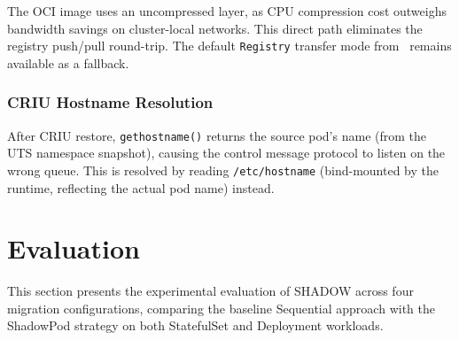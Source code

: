 \documentclass[conference]{IEEEtran}
\begin{document}
The OCI image uses an uncompressed layer, as CPU compression cost outweighs
bandwidth savings on cluster-local networks. This direct path eliminates the
registry push/pull round-trip. The default \texttt{Registry} transfer mode
from~\cite{dinhtuan2025k8s} remains available as a fallback.

\subsubsection{CRIU Hostname Resolution}
\label{sec:hostname}

After CRIU restore, \texttt{gethostname()} returns the source pod's name (from
the UTS namespace snapshot), causing the control message protocol to listen on
the wrong queue. This is resolved by reading \texttt{/etc/hostname} (bind-mounted
by the runtime, reflecting the actual pod name) instead.


\section{Evaluation}
\label{sec:evaluation}

This section presents the experimental evaluation of SHADOW across four
migration configurations, comparing the baseline Sequential approach with the
ShadowPod strategy on both StatefulSet and Deployment workloads.
\end{document}
